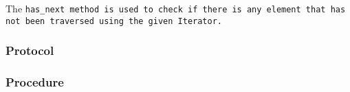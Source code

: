 \def\Subsubsection#1{\subsubsection{#1}
}

The \tt{has_next} method is used to check if there is any element that
has not been traversed using the given \tt{Iterator}.

\Subsubsection{Protocol}

\Subsubsection{Procedure}

